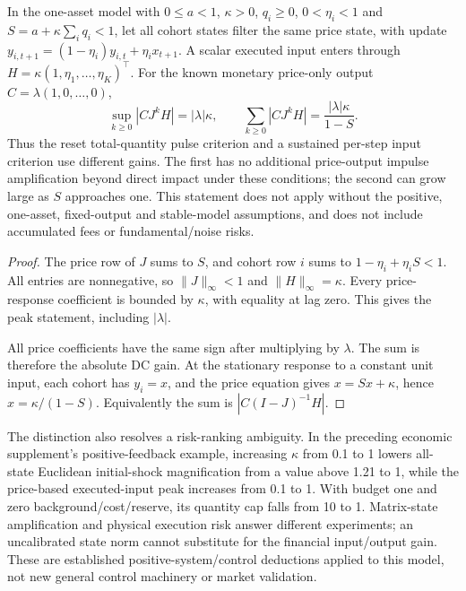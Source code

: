 \begin{proposition}
In the one-asset model with $0\le a<1$, $\kappa>0$, $q_i\ge0$, $0<\eta_i<1$ and $S=a+\kappa\sum_iq_i<1$, let all cohort states filter the same price state, with update $y_{i,t+1}=(1-\eta_i)y_{i,t}+\eta_i x_{t+1}$. A scalar executed input enters through $H=\kappa(1,\eta_1,\ldots,\eta_K)^\top$. For the known monetary price-only output $C=\lambda(1,0,\ldots,0)$,
\[
\sup_{k\ge0}|CJ^kH|=|\lambda|\kappa,
\qquad
\sum_{k\ge0}|CJ^kH|=\frac{|\lambda|\kappa}{1-S}.
\]
Thus the reset total-quantity pulse criterion and a sustained per-step input criterion use different gains. The first has no additional price-output impulse amplification beyond direct impact under these conditions; the second can grow large as $S$ approaches one. This statement does not apply without the positive, one-asset, fixed-output and stable-model assumptions, and does not include accumulated fees or fundamental/noise risks.
\end{proposition}
\begin{proof}
The price row of $J$ sums to $S$, and cohort row $i$ sums to $1-\eta_i+\eta_iS<1$. All entries are nonnegative, so $\|J\|_\infty<1$ and $\|H\|_\infty=\kappa$. Every price-response coefficient is bounded by $\kappa$, with equality at lag zero. This gives the peak statement, including $|\lambda|$.

All price coefficients have the same sign after multiplying by $\lambda$. The sum is therefore the absolute DC gain. At the stationary response to a constant unit input, each cohort has $y_i=x$, and the price equation gives $x=Sx+\kappa$, hence $x=\kappa/(1-S)$. Equivalently the sum is $|C(I-J)^{-1}H|$.
\end{proof}

The distinction also resolves a risk-ranking ambiguity. In the preceding economic supplement's positive-feedback example, increasing $\kappa$ from 0.1 to 1 lowers all-state Euclidean initial-shock magnification from a value above 1.21 to 1, while the price-based executed-input peak increases from 0.1 to 1. With budget one and zero background/cost/reserve, its quantity cap falls from 10 to 1. Matrix-state amplification and physical execution risk answer different experiments; an uncalibrated state norm cannot substitute for the financial input/output gain. These are established positive-system/control deductions applied to this model, not new general control machinery or market validation.

